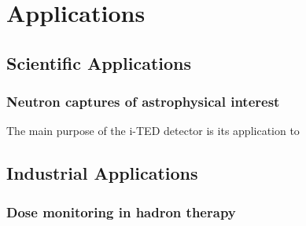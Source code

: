 \chapter{Applications}\label{ch:applications}

\section{Scientific Applications}

\subsection{Neutron captures of astrophysical interest}

The main purpose of the i-TED detector is its application to 

\section{Industrial Applications}

\subsection{Dose monitoring in hadron therapy}

